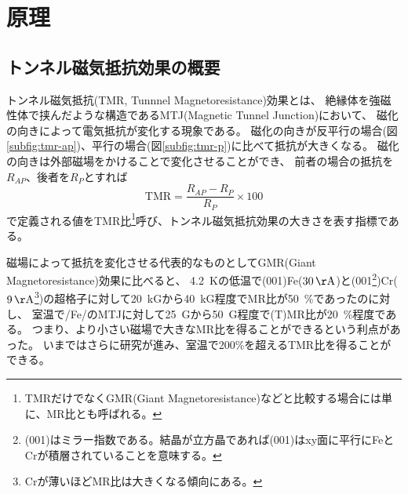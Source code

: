 \documentclass[../../../main]{subfiles}
\begin{document}
\section{原理}

\subsection{トンネル磁気抵抗効果の概要}
トンネル磁気抵抗(TMR, Tunnnel Magnetoresistance)効果とは、
絶縁体を強磁性体で挟んだような構造であるMTJ(Magnetic Tunnel Junction)において、
磁化の向きによって電気抵抗が変化する現象である。
磁化の向きが反平行の場合(図\ref{subfig:tmr-ap})、平行の場合(図\ref{subfig:tmr-p})に比べて抵抗が大きくなる。
磁化の向きは外部磁場をかけることで変化させることができ、
前者の場合の抵抗を$R_{AP}$、後者を$R_P$とすれば
\begin{equation}\label{eq:tmr-ratio}
    \text{TMR} = \frac{R_{AP} - R_P}{R_P} \times 100
\end{equation}
で定義される値をTMR比\footnote{
    TMRだけでなくGMR(Giant Magnetoresistance)などと比較する場合には単に、MR比とも呼ばれる。
}呼び、トンネル磁気抵抗効果の大きさを表す指標である。

磁場によって抵抗を変化させる代表的なものとしてGMR(Giant Magnetoresistance)効果に比べると、
\SI{4.2}{K}の低温で(001)Fe($\SI{30}{\AA}$)と(001\footnote{
    (001)はミラー指数である。結晶が立方晶であれば(001)はxy面に平行にFeとCrが積層されていることを意味する。
})Cr($\SI{9}{\AA}$\footnote{
    Crが薄いほどMR比は大きくなる傾向にある。
})の超格子に対して\SI{20}{kG}から\SI{40}{kG}程度でMR比が\SI{50}{\%}であった\cite{gmr}のに対し、
室温で/Fe/のMTJに対して\SI{25}{G}から\SI{50}{G}程度で(T)MR比が\SI{20}{\%}程度である\cite{tmr}。
つまり、より小さい磁場で大きなMR比を得ることができるという利点があった。
いまではさらに研究が進み、室温で200\%を超えるTMR比を得る\cite{tmr-aist}\cite{tmr-mgo}ことができる。

\end{document}
